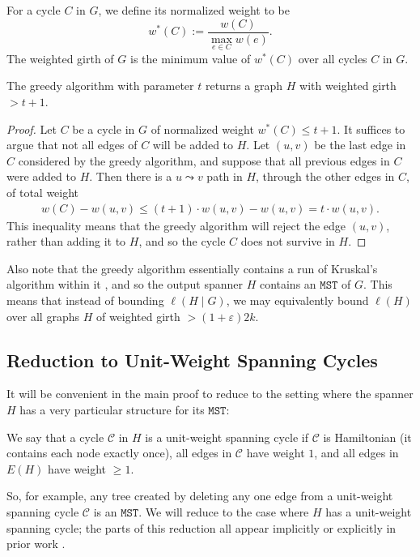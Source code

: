 \documentclass{theoretics}
\newcommand{\eps}{\varepsilon}
\newcommand{\cee}{\mathcal{C}}
\newcommand{\mst}{\texttt{MST}}
\begin{document}
\begin{definition} 
For a cycle $C$ in $G$, we define its normalized weight to be
$$w^*(C) := \frac{w(C)}{\max_{e \in C} w(e)}.$$
The weighted girth of $G$ is the minimum value of $w^*(C)$ over all cycles $C$ in $G$.
\end{definition}

\begin{lemma}  \label{lem:wtgirth}
The greedy algorithm with parameter $t$ returns a graph $H$ with weighted girth $>t+1$.
\end{lemma}
\begin{proof}
Let $C$ be a cycle in $G$ of normalized weight $w^*(C) \le t+1$.
It suffices to argue that not all edges of $C$ will be added to $H$.
Let $(u, v)$ be the last edge in $C$ considered by the greedy algorithm, and suppose that all previous edges in $C$ were added to $H$.
Then there is a $u \leadsto v$ path in $H$, through the other edges in $C$, of total weight
\begin{align*}
w(C) - w(u, v) \le (t+1) \cdot w(u, v) - w(u, v) = t \cdot w(u, v).
\end{align*}
This inequality means that the greedy algorithm will reject the edge $(u, v)$, rather than adding it to $H$, and so the cycle $C$ does not survive in $H$.
\end{proof}

Also note that the greedy algorithm essentially contains a run of Kruskal's algorithm within it \cite{CLRS22}, and so the output spanner $H$ contains an $\mst$ of $G$.
This means that instead of bounding $\ell(H \mid G)$, we may equivalently bound $\ell(H)$ over all graphs $H$ of weighted girth $>(1+\eps)2k$.

\subsection{Reduction to Unit-Weight Spanning Cycles \label{sec:utmst}}

It will be convenient in the main proof to reduce to the setting where the spanner $H$ has a very particular structure for its $\mst$:

\begin{definition} 
We say that a cycle $\cee$ in $H$ is a unit-weight spanning cycle if $\cee$ is Hamiltonian (it contains each node exactly once), all edges in $\cee$ have weight $1$, and all edges in $E(H)$ have weight $\ge 1$.
\end{definition}
So, for example, any tree created by deleting any one edge from a unit-weight spanning cycle $\cee$ is an $\mst$.
We will reduce to the case where $H$ has a unit-weight spanning cycle; the parts of this reduction all appear implicitly or explicitly in prior work \cite{CW18, LS23, ENS15}.
\end{document}

